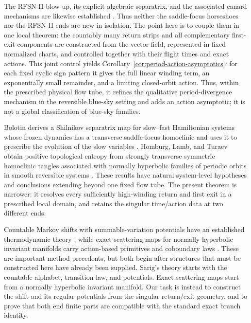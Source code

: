 \documentclass[11pt]{amsart}
\numberwithin{equation}{section}
\theoremstyle{definition}
\theoremstyle{remark}
\begin{document}
The RFSN-II blow-up, its explicit algebraic separatrix, and the associated
canard mechanisms are likewise established \cite{VoDoelmanKaper2025Canards}.
Thus neither the saddle-focus horseshoes nor the RFSN-II ends are new in
isolation.  The point here is to couple them in one local theorem: the
countably many return strips and all complementary first-exit components are
constructed from the vector field, represented in fixed normalized
charts, and controlled together with their flight times and exact actions.
This joint control yields Corollary~\ref{cor:period-action-asymptotics}:
for each fixed cyclic sign pattern it gives the full linear winding term,
an exponentially small remainder, and a limiting closed-orbit action.
Thus, within the prescribed physical flow tube, it refines the qualitative
period-divergence mechanism in the reversible blue-sky setting
\cite{Devaney1977BlueSky} and adds an action asymptotic; it is not a global
classification of blue-sky families.

Bolotin derives a Shilnikov separatrix map for slow--fast Hamiltonian
systems whose frozen dynamics has a transverse saddle-focus homoclinic and
uses it to prescribe the evolution of the slow variables
\cite{Bolotin2025SlowFast}.  Homburg, Lamb, and Turaev obtain positive
topological entropy from strongly transverse symmetric homoclinic tangles
associated with normally hyperbolic families of periodic orbits in smooth
reversible systems \cite{HomburgLambTuraev2025Entropy}.  These results have
natural system-level hypotheses and conclusions extending beyond one
fixed flow tube.  The present theorem is narrower: it resolves every
sufficiently high-winding return and first exit in a prescribed local
domain, and retains the singular time/action data at two different ends.

Countable Markov shifts with summable-variation potentials have an
established thermodynamic theory \cite{Sarig1999Thermodynamic}, while exact
scattering maps for normally hyperbolic invariant manifolds carry
action-based primitives and coboundary laws
\cite{DelshamsDeLaLlaveSeara2008Scattering}.  These are important method
precedents, but both begin after structures that must be constructed here
have already been supplied.  Sarig's theory starts with the countable
alphabet, transition law, and potentials.  Exact scattering maps start
from a normally hyperbolic invariant manifold.  Our task is instead to
construct the shift and its regular potentials from the singular
return/exit geometry, and to prove that both end finite parts are
compatible with the standard exact branch identity.
\end{document}
